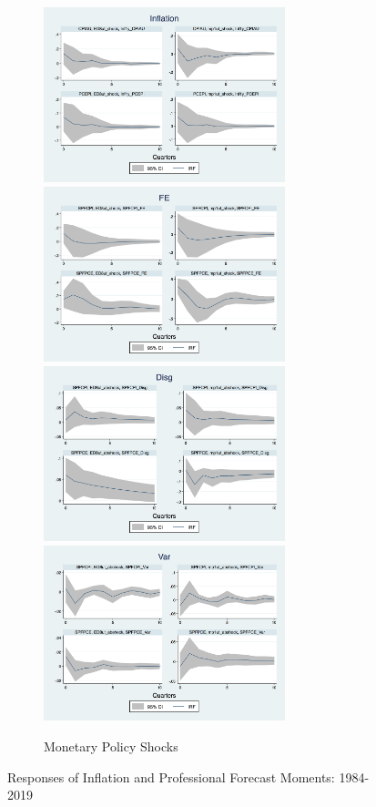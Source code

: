 \documentclass[12pt]{article}
\begin{document}
\begin{figure}[ht]
		\hfill
		\hspace{1em}
		\begin{subfigure}[b]{0.5\textwidth}
			\caption{Monetary Policy Shocks}
			\includegraphics[width=7cm]{figures/Inf_ashocks.png} 
			\smallskip
			\includegraphics[width=7cm]{figures/SPFFE_ashocks.png} 
			\smallskip
			\includegraphics[width=7cm]{figures/SPFDisg_ab_ashocks.png} 
			\smallskip
			\includegraphics[width=7cm]{figures/SPFVar_ab_ashocks.png} 
		\end{subfigure} 
		\caption{Responses of Inflation and Professional Forecast Moments: 1984-2019}
		\label{ReplicateCoibionwholeperiod}
	\end{figure}
	
\end{document}
